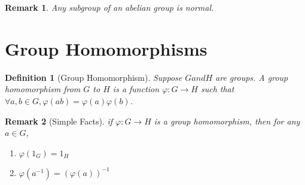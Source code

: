 \documentclass[12pt]{article}
\newtheorem{definition}{Definition}[section]
\newtheorem{remark}{Remark}[section]
\begin{document}
\begin{remark}
    Any subgroup of an abelian group is normal.
\end{remark}

\section{Group Homomorphisms}

\begin{definition}[Group Homomorphism]
Suppose $G and H$ are groups. A group homomorphism from $G$ to $H$ is a function $\varphi : G \to H$ such that
$\forall a,b \in G, \varphi(ab) = \varphi(a)\varphi(b)$.
\end{definition}
\begin{remark}[Simple Facts]
    if $\varphi : G \to H$ is a group homomorphism, then for any $a \in G$,
    \begin{enumerate}
        \item $\varphi(1_G) = 1_H$
        \item $\varphi(a^{-1}) = (\varphi(a))^{-1}$
    \end{enumerate}
\end{remark}
\end{document}
